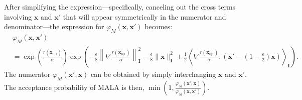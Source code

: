After simplifying the expression—specifically, canceling out the cross terms involving $\mathbf{x}$ and $\mathbf{x}'$ that will appear symmetrically in the numerator and denominator—the expression for $\varphi_M(\mathbf{x},\mathbf{x}')$ becomes:
\begin{align}
    &\varphi_M(\mathbf{x},\mathbf{x}')\\
    &=\exp \left(\frac{r(\mathbf{x}_{0|1})}{\alpha} \right)\exp \left( -\frac{\epsilon}{8}\left\| \nabla \frac{r(\mathbf{x}_{0|1})}{\alpha} \right\|^2_\mathbf{I}-\frac{\epsilon}{8}\|\mathbf{x} \|^2_{\mathbf{I}}+\frac{1}{2}  \left\langle \nabla \frac{r(\mathbf{x}_{0|1})}{\alpha},\left(\mathbf{x}'-\left(1-\frac{\epsilon}{2} \right)\mathbf{x} \right) \right\rangle_{\mathbf{I}}  \right).
\end{align}
The numerator $\varphi_M(\mathbf{x}', \mathbf{x})$ can be obtained by simply interchanging $\mathbf{x}$ and $\mathbf{x}'$.
The acceptance probability of MALA is then, $\min \left(1, \frac{\varphi_M(\mathbf{x}',\mathbf{x})}{\varphi_M(\mathbf{x}, \mathbf{x}')} \right)$.